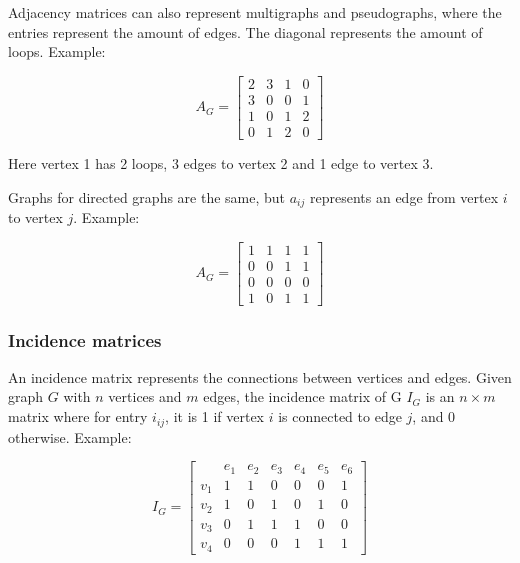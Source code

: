 
Adjacency matrices can also represent multigraphs and pseudographs, where the entries represent the amount of edges. The diagonal represents the amount of loops.
Example:
\begin{table}[H]
    \[
        A_G =
        \begin{bmatrix}
            2 & 3 & 1 & 0 \\
            3 & 0 & 0 & 1 \\
            1 & 0 & 1 & 2 \\
            0 & 1 & 2 & 0
        \end{bmatrix}
    \]
    \caption{Adjacency matrix of a pseudograph C}
\end{table}
Here vertex 1 has 2 loops, 3 edges to vertex 2 and 1 edge to vertex 3.


Graphs for directed graphs are the same, but $a_{ij}$ represents an edge from vertex $i$ to vertex $j$.
Example:
\begin{table}[H]
    \[
        A_G =
        \begin{bmatrix}
            1 & 1 & 1 & 1 \\
            0 & 0 & 1 & 1 \\
            0 & 0 & 0 & 0 \\
            1 & 0 & 1 & 1
        \end{bmatrix}
    \]
    \caption{Adjacency matrix of directed graph B}
\end{table}

\subsubsection{Incidence matrices}
An incidence matrix represents the connections between vertices and edges.
Given graph $G$ with $n$ vertices and $m$ edges, the incidence matrix of G $I_G$ is an $n \times m$ matrix where for entry $i_{ij}$, it is 1 if vertex $i$ is connected to edge $j$, and 0 otherwise.
Example:
\begin{table}[H]
    \[
        I_G =
        \begin{bmatrix}
                & e_1 & e_2 & e_3 & e_4 & e_5 & e_6 \\
            v_1 & 1 & 1 & 0 & 0 & 0 & 1 \\
            v_2 & 1 & 0 & 1 & 0 & 1 & 0 \\
            v_3 & 0 & 1 & 1 & 1 & 0 & 0 \\
            v_4 & 0 & 0 & 0 & 1 & 1 & 1
        \end{bmatrix}
    \]
    \caption{Incidence matrix of undirected graph A}
\end{table} 

